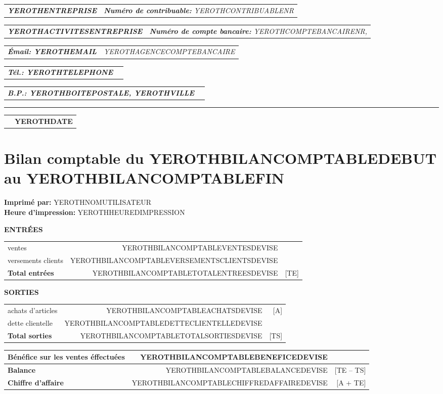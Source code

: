 \documentclass[11pt,YEROTHPAPERSPEC,landscape]{article} %
\makeatletter
\newcommand{\headerrow}[2]
{\begin{tabular*}{\linewidth}{l@{\extracolsep{\fill}}r}
	#1 &
	#2 \\
\end{tabular*}}
\newcommand{\emphbold}[1]{\textbf{\emph{#1}}\xspace}
\makeatother
\begin{document}
\bigskip

\headerrow
	{\emphbold{YEROTHENTREPRISE}}
	{\emph{\textbf{Num\'ero de contribuable:} YEROTHCONTRIBUABLENR}}
\headerrow
	{\emphbold{YEROTHACTIVITESENTREPRISE}}
	{\emph{\textbf{Num\'ero de compte bancaire:} YEROTHCOMPTEBANCAIRENR,}}
\headerrow
	{\emphbold{\'Email: YEROTHEMAIL}}
	{\emph{YEROTHAGENCECOMPTEBANCAIRE}}
\headerrow
	{\emphbold{T\'el.: YEROTHTELEPHONE}}
	{}
\headerrow
	{\emphbold{B.P.: YEROTHBOITEPOSTALE, YEROTHVILLE}}
	{}
	
\hrule

\headerrow
	{}
	{\textbf{YEROTHDATE}}

\section*{Bilan comptable du YEROTHBILANCOMPTABLEDEBUT au YEROTHBILANCOMPTABLEFIN}

\textbf{Imprim\'e par:} YEROTHNOMUTILISATEUR\\
\textbf{Heure d'impression:} YEROTHHEUREDIMPRESSION\\

\vspace{0.3cm}

\vspace{1cm}
\textbf{ENTR\'EES}
\begin{table}[!htbp]
\begin{tabular}{lrr}
ventes  				&  YEROTHBILANCOMPTABLEVENTESDEVISE  			& \\ 
versements clients  	&  YEROTHBILANCOMPTABLEVERSEMENTSCLIENTSDEVISE  & \\ \hline
\textbf{Total entr\'ees}  		&  YEROTHBILANCOMPTABLETOTALENTREESDEVISE & [TE] 		\\ 
\end{tabular}
\end{table}


\vspace{1cm}
\textbf{SORTIES}
\begin{table}[!htbp]
\begin{tabular}{lrr}
achats d'articles  	&  YEROTHBILANCOMPTABLEACHATSDEVISE  			& [A] \\ 
dette clientelle  		&  YEROTHBILANCOMPTABLEDETTECLIENTELLEDEVISE &  	\\ \hline
\textbf{Total sorties}  		&  YEROTHBILANCOMPTABLETOTALSORTIESDEVISE & [TS] 		\\ 
\end{tabular}
\end{table}


\vspace{1cm}

\begin{table}[!htbp]
\centering
\begin{tabular}{lrr}
\textbf{B\'en\'efice sur les ventes \'effectu\'ees}  &  YEROTHBILANCOMPTABLEBENEFICEDEVISE &  \\ \hline
\textbf{Balance}  			&  YEROTHBILANCOMPTABLEBALANCEDEVISE  & [TE -- TS]\\ \hline
\textbf{Chiffre d'affaire}  &  YEROTHBILANCOMPTABLECHIFFREDAFFAIREDEVISE  & [A + TE]\\ 
\end{tabular}
\end{table}
\end{document}
